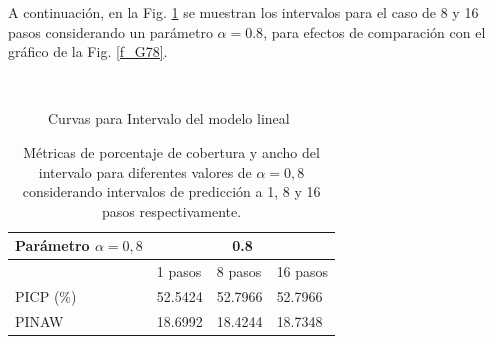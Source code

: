 \documentclass[12pt]{article}
\begin{document}
A continuación, en la Fig. \ref{f_G1112}  se muestran los intervalos para el caso de 8 y 16 pasos considerando un parámetro $\alpha=0.8$, para efectos de comparación con el gráfico de la Fig. \ref{f_G78}.

\begin{figure}[h!]
		\centering
		\captionsetup{justification=centering}
		\\
		\caption{Curvas para Intervalo del modelo lineal}
		\label{f_G1112}
\end{figure}

\begin{table}[htbp]
  \centering
  \captionsetup{justification=centering}
  \caption{Métricas de porcentaje de cobertura y ancho del intervalo para diferentes valores de $\alpha=0,8$ considerando intervalos de predicción a 1, 8 y 16 pasos respectivamente.}
\begin{tabular}{|l|l|l|l|}
	\hline
	Parámetro $\alpha=0,8$ & \multicolumn{3}{c|}{0.8}     \\ \hline
	& 1 pasos & 8 pasos & 16 pasos \\ \hline
	PICP (\%)              & 52.5424 & 52.7966 & 52.7966  \\ \hline
	PINAW                  & 18.6992 & 18.4244 & 18.7348  \\ \hline
\end{tabular}
  \label{t_G3}%
\end{table}%
\end{document}
